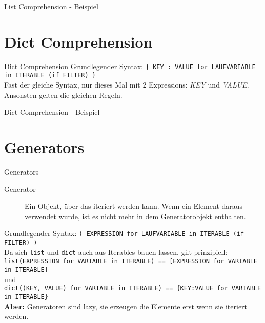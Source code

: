 \begin{frame}{List Comprehension - Beispiel}
	
\end{frame}



\section{Dict Comprehension}
\begin{frame}{Dict Comprehension}
  Grundlegender Syntax: \alert{\texttt{\{ KEY : VALUE for LAUFVARIABLE in ITERABLE (if FILTER) \}}}\\[.75cm]
  Fast der gleiche Syntax, nur dieses Mal mit 2 Expressions: \textit{KEY} und \textit{VALUE}. Ansonsten gelten die gleichen Regeln.
\end{frame}

\begin{frame}{Dict Comprehension - Beispiel}
	
\end{frame}



\section{Generators}
\begin{frame}{Generators}
	\begin{description}
		\item[Generator] Ein Objekt, \"uber das iteriert werden kann. Wenn ein Element daraus verwendet wurde, ist es nicht mehr in dem Generatorobjekt enthalten.\\[.5cm]
	\end{description}
	Grundlegender Syntax: \alert{\texttt{( EXPRESSION for LAUFVARIABLE in ITERABLE (if FILTER) )}}\\
	Da sich \alert{\texttt{list}} und \alert{\texttt{dict}} auch aus Iterables bauen lassen, gilt prinzipiell:\\[.25cm]

		\alert{\texttt{list(EXPRESSION for VARIABLE in ITERABLE) == [EXPRESSION for VARIABLE in ITERABLE]}}\\[.25cm]
		und\\[.25cm]
		\alert{\texttt{dict((KEY, VALUE) for VARIABLE in ITERABLE) == \{KEY:VALUE for VARIABLE in ITERABLE\}}}\\[.25cm]

	\textbf{Aber:} Generatoren sind lazy, sie erzeugen die Elemente erst wenn sie iteriert werden.
\end{frame}

